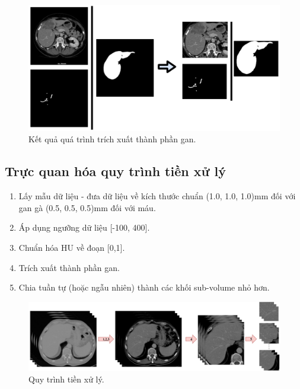 \begin{figure}[H]
    \centering
    \includegraphics[width=12cm]{images/blood/extract_liver.pdf}
    \caption{Kết quả quá trình trích xuất thành phần gan.}
\end{figure}

\subsection{Trực quan hóa quy trình tiền xử lý}
\begin{enumerate}
    \item Lấy mẫu dữ liệu - đưa dữ liệu về kích thước chuẩn (1.0, 1.0, 1.0)mm đối với gan gà (0.5, 0.5, 0.5)mm đối với máu.
    \item Áp dụng ngưỡng dữ liệu [-100, 400].
    \item Chuẩn hóa HU về đoạn [0,1].
    \item Trích xuất thành phần gan.
    \item Chia tuần tự (hoặc ngẫu nhiên) thành các khối sub-volume nhỏ hơn.
\end{enumerate}
\begin{figure}[H]
    \centering
    \includegraphics[width=14cm]{images/blood/preprocess_stage.pdf}
    \caption{Quy trình tiền xử lý.}
\end{figure}